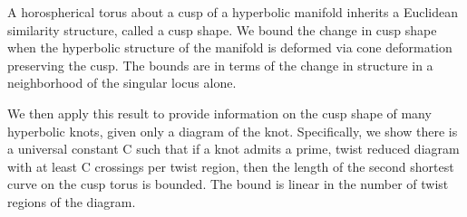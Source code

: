 A horospherical torus about a cusp of a hyperbolic manifold inherits a
Euclidean similarity structure, called a cusp shape.  We bound the
change in cusp shape when the hyperbolic structure of the manifold is
deformed via cone deformation preserving the cusp.  The bounds are in
terms of the change in structure in a neighborhood of the singular
locus alone.

We then apply this result to provide information on the cusp shape of
many hyperbolic knots, given only a diagram of the knot.
Specifically, we show there is a universal constant C such that if a
knot admits a prime, twist reduced diagram with at least C crossings
per twist region, then the length of the second shortest curve on the
cusp torus is bounded.  The bound is linear in the number
of twist regions of the diagram.


